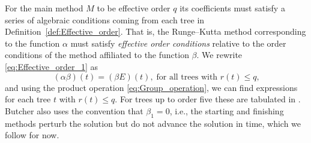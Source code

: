 For the main method $M$ to be effective order $q$ its coefficients must satisfy a series of algebraic conditions coming from each tree in Definition~\ref{def:Effective_order}.
That is, the Runge--Kutta method corresponding to the function $\alpha$ must satisfy
\emph{effective order conditions} relative to the order conditions of the
method affiliated to the function $\beta$.
We rewrite \eqref{eq:Effective_order_1} as
\begin{equation}\label{eq:Effective_order_2}
	(\alpha\beta)(t) = (\beta E)(t), \; \text{for all trees with $r(t) \leq q$,}
\end{equation}
and using the product operation \eqref{eq:Group_operation}, we can find expressions for each tree $t$ with $r(t) \leq q$.
For trees up to order five these are tabulated in \cite[Table~3.89]{Butcher2008_book}.
Butcher \cite{Butcher2008_book} also uses the convention that $\beta_1 = 0$, i.e., the starting and finishing methods perturb the solution but do not advance the solution in time, which we follow for now.
